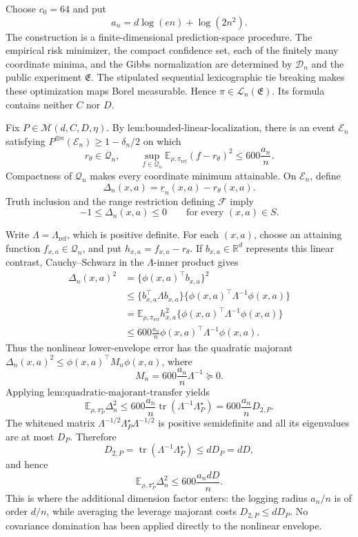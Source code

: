 Choose \(c_0=64\) and put
\[
a_n=d\log(en)+\log(2n^2).
\]
The construction is a finite-dimensional prediction-space procedure. The empirical risk minimizer, the compact confidence set, each of the finitely many coordinate minima, and the Gibbs normalization are determined by \(\mathcal D_n\) and the public experiment \(\mathfrak E\). The stipulated sequential lexicographic tie breaking makes these optimization maps Borel measurable. Hence \(\widehat\pi\in\mathcal L_n(\mathfrak E)\). Its formula contains neither \(C\) nor \(D\).

Fix \(P\in\mathcal M(d,C,D,\eta)\). By \(\text{lem:bounded-linear-localization}\), there is an event \(\mathcal E_n\) satisfying \(P^{\otimes n}(\mathcal E_n)\ge1-\delta_n/2\) on which
\[
r_\theta\in\mathcal Q_n,
\qquad
\sup_{f\in\mathcal Q_n}\mathbb E_{\rho,\pi_{\mathrm{ref}}}(f-r_\theta)^2
\le 600\frac{a_n}{n}.
\]
Compactness of \(\mathcal Q_n\) makes every coordinate minimum attainable. On \(\mathcal E_n\), define
\[
\Delta_n(x,a)=\underline r_n(x,a)-r_\theta(x,a).
\]
Truth inclusion and the range restriction defining \(\mathcal F\) imply
\[
-1\le\Delta_n(x,a)\le0
\qquad\text{for every }(x,a)\in S.
\]

Write \(\Lambda=\Lambda_{\mathrm{ref}}\), which is positive definite. For each \((x,a)\), choose an attaining function \(f_{x,a}\in\mathcal Q_n\), and put \(h_{x,a}=f_{x,a}-r_\theta\). If \(b_{x,a}\in\mathbb R^d\) represents this linear contrast, Cauchy--Schwarz in the \(\Lambda\)-inner product gives
\[
\begin{aligned}
\Delta_n(x,a)^2
&=\{\phi(x,a)^\top b_{x,a}\}^2\\
&\le \{b_{x,a}^\top\Lambda b_{x,a}\}\{\phi(x,a)^\top\Lambda^{-1}\phi(x,a)\}\\
&=\mathbb E_{\rho,\pi_{\mathrm{ref}}}h_{x,a}^2\{\phi(x,a)^\top\Lambda^{-1}\phi(x,a)\}\\
&\le 600\frac{a_n}{n}\phi(x,a)^\top\Lambda^{-1}\phi(x,a).
\end{aligned}
\]
Thus the nonlinear lower-envelope error has the quadratic majorant \(\Delta_n(x,a)^2\le\phi(x,a)^\top M_n\phi(x,a)\), where
\[
M_n=600\frac{a_n}{n}\Lambda^{-1}\succeq0.
\]
Applying \(\text{lem:quadratic-majorant-transfer}\) yields
\[
\mathbb E_{\rho,\pi_P^\star}\Delta_n^2
\le600\frac{a_n}{n}\operatorname{tr}(\Lambda^{-1}\Lambda_P^\star)
=600\frac{a_n}{n}D_{2,P}.
\]
The whitened matrix \(\Lambda^{-1/2}\Lambda_P^\star\Lambda^{-1/2}\) is positive semidefinite and all its eigenvalues are at most \(D_P\). Therefore
\[
D_{2,P}=\operatorname{tr}(\Lambda^{-1}\Lambda_P^\star)\le dD_P=dD,
\]
and hence
\[
\mathbb E_{\rho,\pi_P^\star}\Delta_n^2\le600\frac{a_ndD}{n}.
\]
This is where the additional dimension factor enters: the logging radius \(a_n/n\) is of order \(d/n\), while averaging the leverage majorant costs \(D_{2,P}\le dD_P\). No covariance domination has been applied directly to the nonlinear envelope.

